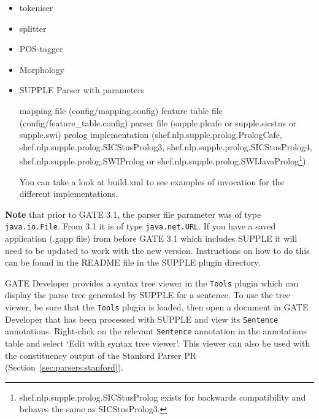 \begin{itemize}

\item tokeniser

\item splitter

\item POS-tagger

\item Morphology

\item SUPPLE Parser with parameters

\subitem mapping file (config/mapping.config)
\subitem feature table file (config/feature\_table.config)
\subitem parser file (supple.plcafe or supple.sicstus or
supple.swi)
\subitem prolog implementation (shef.nlp.supple.prolog.PrologCafe,\\
shef.nlp.supple.prolog.SICStusProlog3, shef.nlp.supple.prolog.SICStusProlog4,\\
shef.nlp.supple.prolog.SWIProlog or
shef.nlp.supple.prolog.SWIJavaProlog\footnote{shef.nlp.supple.prolog.SICStusProlog
exists for backwards compatibility and behaves the same as SICStusProlog3.}).

You can take a look at build.xml to see examples of invocation for
the different implementations.

\end{itemize}

\textbf{Note} that prior to GATE 3.1, the parser file parameter was of type
\texttt{java.io.File}.  From 3.1 it is of type \texttt{java.net.URL}.  If you
have a saved application (.gapp file) from before GATE 3.1 which includes
SUPPLE it will need to be updated to work with the new version.  Instructions
on how to do this can be found in the README file in the SUPPLE plugin
directory.



GATE Developer provides a syntax tree viewer in the \texttt{Tools} plugin which
can display the parse tree generated by SUPPLE for a sentence.  To use the tree
viewer, be sure that the \texttt{Tools} plugin is loaded, then open a document in
GATE Developer that has been processed with SUPPLE and view its \texttt{Sentence}
annotations.  Right-click on the relevant \texttt{Sentence} annotation in the
annotations table and select `Edit with syntax tree viewer'.  This viewer can
also be used with the constituency output of the Stanford Parser PR
(Section~\ref{sec:parsers:stanford}).


